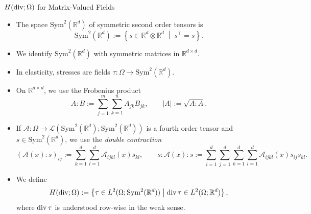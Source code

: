 \documentclass[10pt,aspectratio=169]{beamer}
\def\R{{\mathbb R}}
\def\cA{{\mathcal A}}
\def\cL{{\mathcal L}}
\def\symd{{\mathrm{Sym}^2(\R^d)}}
\newcommand{\diver}{\operatornamewithlimits{div}}
\begin{document}
\begin{frame}{$H(\diver;\Omega)$ for Matrix-Valued Fields}
	\begin{itemize}
		\item The space $\symd$ of symmetric second order tensors is
		      \begin{equation*}
			      \symd:= \left\{ s\in\R^d\otimes\R^d\;\middle|\; s^\top = s\right\}.
		      \end{equation*}
		\item We identify $\symd$ with symmetric matrices in $\R^{d\times d}$.
		\item In elasticity, stresses are fields $\tau:\Omega\to\symd$.
		\item On $\R^{d\times d}$, we use the Frobenius product
		      \begin{equation*}
			      A:B := \sum_{j=1}^m\sum_{k=1}^n A_{jk}B_{jk},
			      \qquad
			      |A| := \sqrt{A:A}.
		      \end{equation*}
		\item If $\cA:\Omega\to\cL(\symd;\symd)$ is a fourth order tensor and $s\in\symd$, we use the {\em double contraction}
		      \begin{equation*}
			      (\cA(x):s)_{ij}:=\sum_{k = 1}^d \sum_{l = 1}^d \cA_{ijkl}(x)s_{kl},
			      \qquad
			      s:\cA(x):s:=\sum_{i = 1}^d \sum_{j = 1}^d \sum_{k = 1}^d \sum_{l = 1}^d\cA_{ijkl}(x)s_{ij}s_{kl}.
		      \end{equation*}
		\item We define
		      \begin{equation*}
			      H(\diver;\Omega)
			      :=
			      \left\{\tau\in L^2(\Omega;\symd)\;\middle|\;\diver\tau\in L^2(\Omega;\R^d)\right\},
		      \end{equation*}
		      where $\diver\tau$ is understood row-wise in the weak sense.
	\end{itemize}
\end{frame}
\end{document}
